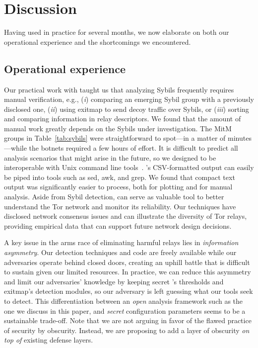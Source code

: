 \section{Discussion}
\label{sec:discussion}
Having used \sys in practice for several months, we now elaborate on both our
operational experience and the shortcomings we encountered.

\subsection{Operational experience}
\label{sec:operational}
Our practical work with \sys taught us that analyzing Sybils frequently
requires manual verification, e.g., (\emph{i}) comparing an emerging Sybil
group with a previously disclosed one, (\emph{ii}) using exitmap to send decoy
traffic over Sybils, or (\emph{iii}) sorting and comparing information in relay
descriptors.  We found that the amount of manual work greatly depends on the
Sybils under investigation.  The MitM groups in Table~\ref{tab:sybils} were
straightforward to spot---in a matter of minutes---while the botnets required a
few hours of effort.  It is difficult to predict all analysis scenarios that
might arise in the future, so we designed \sys to be interoperable with Unix
command line tools~\cite{Pike1983a}.  \Sys's CSV-formatted output can easily be
piped into tools such as sed, awk, and grep.  We found that compact text output
was significantly easier to process, both for plotting and for manual analysis.
Aside from Sybil detection, \sys can serve as valuable tool to better
understand the Tor network and monitor its reliability.  Our techniques have
disclosed network consensus issues and can illustrate the diversity of Tor
relays, providing empirical data that can support future network design
decisions.

A key issue in the arms race of eliminating harmful relays lies in
\emph{information asymmetry}.  Our detection techniques and code are freely
available while our adversaries operate behind closed doors, creating an uphill
battle that is difficult to sustain given our limited resources.  In practice,
we can reduce this asymmetry and limit our adversaries' knowledge by keeping
secret \sys's thresholds and exitmap's detection modules, so our adversary is
left guessing what our tools seek to detect.  This differentiation between an
\emph{open} analysis framework such as the one we discuss in this paper, and
\emph{secret} configuration parameters seems to be a sustainable trade-off.
Note that we are not arguing in favor of the flawed practice of security by
obscurity.  Instead, we are proposing to add a layer of obscurity \emph{on top
of} existing defense layers.

